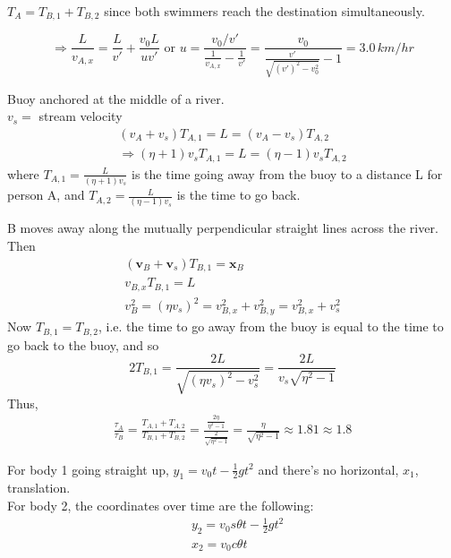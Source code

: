 $T_A = T_{B,1} + T_{B,2}$ since both swimmers reach the destination simultaneously. 

\[
\Longrightarrow \frac{ L}{v_{A,x}} = \frac{L}{v'} + \frac{v_0 L}{uv'} \text{ or } u = \frac{v_0 / v'}{ \frac{1}{ v_{A,x}} - \frac{1}{v'} } = \boxed{ \frac{ v_0}{ \frac{v'}{ \sqrt{ (v')^2 - v_0^2} } - 1 }  }= 3.0 \, km/hr
\]


Buoy anchored at the middle of a river. \\
$v_s = $ stream velocity \\

\[
\begin{gathered}
(v_A + v_s) T_{A,1} = L = (v_A -v_s) T_{A,2} \\
\Longrightarrow (\eta + 1) v_s T_{A,1} = L = (\eta - 1) v_s T_{A,2}	
\end{gathered}
\]
where $T_{A,1} = \frac{L}{ (\eta + 1) v_s}$ is the time going away from the buoy to a distance L for person A, and $T_{A,2} = \frac{L}{ (\eta - 1) v_s} $ is the time to go back.

B moves away along the mutually perpendicular straight lines across the river. Then
\[
\begin{gathered}
	(\mathbf{v}_B + \mathbf{v}_s) T_{B,1} = \mathbf{x}_B \\
	v_{B,x} T_{B,1} = L \\
	v_B^2  = (\eta v_s)^2 = v_{B,x}^2 + v_{B,y}^2 = v_{B,x}^2 + v_s^2
\end{gathered}
\]
Now $T_{B,1} = T_{B,2}$, i.e. the time to go away from the buoy is equal to the time to go back to the buoy, and so
\[
2 T_{B,1} = \frac{2L}{ \sqrt{ (\eta v_s)^2 - v_s^2} } = \frac{2L}{ v_s \sqrt{ \eta^2 - 1} }
\]
Thus,
\[
\begin{gathered}
	\frac{\tau_A}{ \tau_B} = \frac{T_{A,1} + T_{A,2} }{ T_{B,1} + T_{B,2}} = \frac{ \frac{2\eta}{\eta^2 - 1} }{ \frac{2 }{\sqrt{\eta^2 - 1} } } = \boxed{ \frac{ \eta}{ \sqrt{ \eta^2 - 1 } } } \approx 1.81 \approx 1.8
\end{gathered}
\]


For body 1 going straight up, $y_1 = v_0 t - \frac{1}{2} gt^2$ and there's no horizontal, $x_1$, translation. \\

For body 2, the coordinates over time are the following:
\[
\begin{aligned}
	& y_2 = v_0s{\theta} t - \frac{1}{2} gt^2 \\
	& x_2 = v_0 c{\theta} t
\end{aligned}
\]

